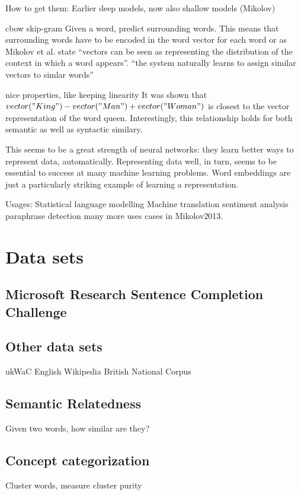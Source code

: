 \documentclass{sig-alternate-05-2015}
\begin{document}
How to get them: Earlier deep models, now also shallow models (Mikolov)

cbow
skip-gram
Given a word, predict surrounding words.
This means that surrounding words have to be encoded in the word vector for each word or as Mikolov et al.\cite{Mikolov2013} state ``vectors can be seen as representing the distribution of the context in which a word appears''.
``the system naturally learns to assign similar vectors to simlar words'' \cite{Baroni2014}

nice properties, like keeping linearity
It was shown that $vector("King") - vector("Man") + vector("Woman")$ is closest to the vector representation of the word queen\cite{Mikolov2013b}.
Interestingly, this relationship holds for both semantic as well as syntactic similary\cite{Mikolov2013a}.

This seems to be a great strength of neural networks: they learn better ways to represent data, automatically. Representing data well, in turn, seems to be essential to success at many machine learning problems. Word embeddings are just a particularly striking example of learning a representation.


Usages:
Statistical language modelling
Machine translation\cite{Zou2013}
sentiment analysis\cite{Maas2011}
paraphrase detection
many more uses cases in Mikolov2013.
\section{Data sets}

\subsection{Microsoft Research Sentence Completion Challenge}
\subsection{Other data sets}
ukWaC
English Wikipedia
British National Corpus

\subsection{Semantic Relatedness}
Given two words, how similar are they?
\subsection{Concept categorization}
Cluster words, measure cluster purity
\end{document}
